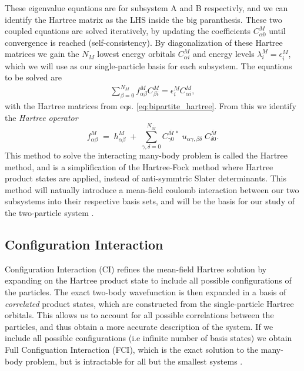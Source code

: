 \documentclass{subfiles}
\begin{document}
These eigenvalue equations are for subsystem A and B respectivly, and we can identify the Hartree matrix as the LHS inside the big paranthesis. These two coupled equations are solved iteratively, by updating the coefficients $C_{\alpha 0}^M$ until convergence is reached (self-consistency). By diagonalization of these Hartree matrices we gain the $N_M$ lowest energy orbitals $C^M_{\alpha i}$ and energy levels $\lambda^M_i=\epsilon^M_i$\cite{leinonen2024coulomb}, which we will use as our single-particle basis for each subsystem. The equations to be solved are
\begin{align}
    \sum_{\beta=0}^{N_M} f_{\alpha\beta}^M C^M_{\beta i} = \epsilon_i^M C^M_{\alpha i}\label{eq:hartree_eigenvalue},
\end{align}
with the Hartree matrices from eqs. \eqref{eq:bipartite_hartree}. From this we identify the \emph{Hartree operator}
\begin{equation}
    f_{\alpha\beta}^M \;=\; h_{\alpha\beta}^M
    \;+\;\sum_{\gamma,\delta=0}^{N_{\bar M}}
      C_{\gamma0}^{\bar M\,*}\;u_{\alpha\gamma,\beta\delta}\;C_{\delta0}^{\bar M}.
\label{eq:hartree_operator}
\end{equation}
This method to solve the interacting many-body problem is called the Hartree method, and is a simplification of the Hartree-Fock method where Hartree product states are applied, instead of anti-symmtric Slater determinants. This method will natually introduce a mean-field coulomb interaction between our two subsystems into their respective basis sets, and will be the basis for our study of the two-particle system \cite{leinonen2024coulomb}.
\subsection{Configuration Interaction}\label{sec:CI}
Configuration Interaction (CI) refines the mean-field Hartree solution by expanding on the Hartree product state to include all possible configurations of the particles. The exact two-body wavefunction is then expanded in a basis of \emph{correlated} product states, which are constructed from the single-particle Hartree orbitals. This allows us to account for all possible correlations between the particles, and thus obtain a more accurate description of the system. If we include all possible configurations (i.e infinite number of basis states) we obtain Full Configuation Interaction (FCI), which is the exact solution to the many-body problem, but is intractable for all but the smallest systems \cite{helgaker2013molecular, szabo1996modern}. \\
\end{document}
